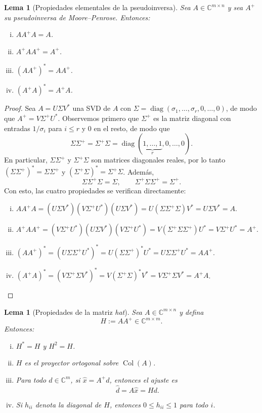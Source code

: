 \documentclass[a4paper,11pt]{report}
\newtheorem{lemma}[theorem]{Lema}
\begin{document}
\begin{lemma}[Propiedades elementales de la pseudoinversa]
Sea $A\in\mathbb{C}^{m\times n}$ y sea $A^+$ su pseudoinversa de Moore--Penrose. Entonces:
\begin{enumerate}[(i)]
\item $AA^+A=A$.
\item $A^+AA^+=A^+$.
\item $(AA^+)^*=AA^+$.
\item $(A^+A)^*=A^+A$.
\end{enumerate}
\end{lemma}

\begin{proof}
Sea $A=U\Sigma V^*$ una SVD de $A$ con $\Sigma=\operatorname{diag}(\sigma_1,\ldots,\sigma_r,0,\ldots,0)$, de modo que $A^+=V\Sigma^+U^*$.
Observemos primero que $\Sigma^+$ es la matriz diagonal con entradas $1/\sigma_i$ para $i\le r$ y $0$ en el resto, de modo que
\[
\Sigma\Sigma^+=\Sigma^+\Sigma=\operatorname{diag}(\underbrace{1,\ldots,1}_{r},0,\ldots,0).
\]
En particular, $\Sigma\Sigma^+$ y $\Sigma^+\Sigma$ son matrices diagonales reales, por lo tanto $(\Sigma\Sigma^+)^*=\Sigma\Sigma^+$ y $(\Sigma^+\Sigma)^*=\Sigma^+\Sigma$. Además,
\[
\Sigma\Sigma^+\Sigma=\Sigma,\qquad \Sigma^+\Sigma\Sigma^+=\Sigma^+.
\]
Con esto, las cuatro propiedades se verifican directamente:
\begin{enumerate}[(i)]
\item $AA^+A=(U\Sigma V^*)(V\Sigma^+U^*)(U\Sigma V^*)=U(\Sigma\Sigma^+\Sigma)V^*=U\Sigma V^*=A$.
\item $A^+AA^+=(V\Sigma^+U^*)(U\Sigma V^*)(V\Sigma^+U^*)=V(\Sigma^+\Sigma\Sigma^+)U^*=V\Sigma^+U^*=A^+$.
\item $(AA^+)^*=(U\Sigma\Sigma^+U^*)^*=U(\Sigma\Sigma^+)^*U^*=U\Sigma\Sigma^+U^*=AA^+$.
\item $(A^+A)^*=(V\Sigma^+\Sigma V^*)^*=V(\Sigma^+\Sigma)^*V^*=V\Sigma^+\Sigma V^*=A^+A$.
\end{enumerate}
\end{proof}




\begin{lemma}[Propiedades de la matriz \emph{hat}]
Sea $A\in\mathbb{C}^{m\times n}$ y defina
\[
H:=AA^+\in\mathbb{C}^{m\times m}.
\]
Entonces:
\begin{enumerate}[(i)]
\item $H^*=H$ y $H^2=H$.
\item $H$ es el proyector ortogonal sobre $\operatorname{Col}(A)$.
\item Para todo $d\in\mathbb{C}^m$, si $\hat{x}=A^+d$, entonces el ajuste es
\[
\hat{d}=A\hat{x}=Hd.
\]
\item Si $h_{ii}$ denota la diagonal de $H$, entonces $0\le h_{ii}\le 1$ para todo $i$.
\end{enumerate}
\end{lemma}
\end{document}
